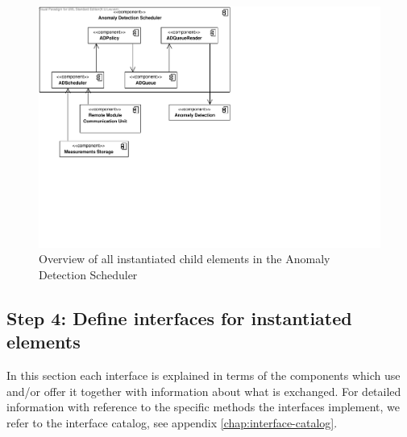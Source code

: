 \begin{figure}[H]
	\begin{centering}
		\includegraphics[width=\textwidth]{figs/add-it5-elements.pdf}
		\caption{Overview of all instantiated child elements in the Anomaly
		Detection Scheduler}
		\label{fig:it5/elements}
	\end{centering}
\end{figure}

\subsection{Step 4: Define interfaces for instantiated elements}
\label{add:it5/interfaces}

\npar In this section each interface is explained in terms of the components
which use and/or offer it together with information about what is exchanged. For
detailed information with reference to the specific methods the interfaces
implement, we refer to the interface catalog, see appendix
\ref{chap:interface-catalog}.

% 

